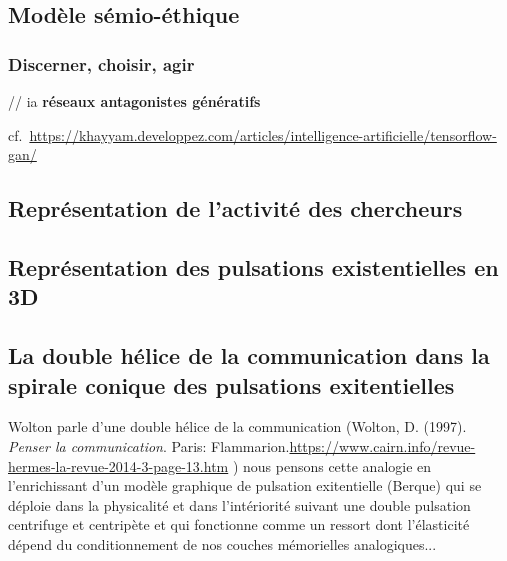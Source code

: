 \documentclass[
  a4paper,
  DIV=11,
  numbers=noendperiod]{scrreprt}
\begin{document}

\subsection*{Modèle sémio-éthique}\label{moduxe8le-suxe9mio-uxe9thique}

\subsubsection*{Discerner, choisir, agir}\label{discerner-choisir-agir}

// ia \textbf{réseaux antagonistes génératifs}

cf.~\url{https://khayyam.developpez.com/articles/intelligence-artificielle/tensorflow-gan/}

\subsection*{Représentation de l'activité des
chercheurs}\label{sec-datavizActiChercheur}

\subsection*{Représentation des pulsations existentielles en
3D}\label{sec-pulsaExi3D}

\subsection*{La double hélice de la communication dans la spirale
conique des pulsations
exitentielles}\label{la-double-huxe9lice-de-la-communication-dans-la-spirale-conique-des-pulsations-exitentielles}

Wolton parle d'une double hélice de la communication (Wolton, D. (1997).
\emph{Penser la communication}. Paris:
Flammarion.\url{https://www.cairn.info/revue-hermes-la-revue-2014-3-page-13.htm}
) nous pensons cette analogie en l'enrichissant d'un modèle graphique de
pulsation exitentielle (Berque) qui se déploie dans la physicalité et
dans l'intériorité suivant une double pulsation centrifuge et centripète
et qui fonctionne comme un ressort dont l'élasticité dépend du
conditionnement de nos couches mémorielles analogiques...
\end{document}
